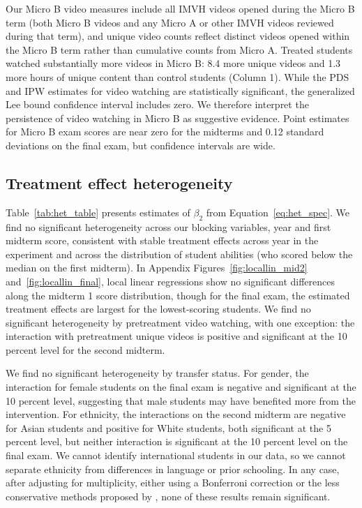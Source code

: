 
Our Micro B video measures include all IMVH videos opened during the Micro B term (both Micro B videos and any Micro A or other IMVH videos reviewed during that term), and unique video counts reflect distinct videos opened within the Micro B term rather than cumulative counts from Micro A.
Treated students watched substantially more videos in Micro B: 8.4 more unique videos and 1.3 more hours of unique content than control students (Column 1).
While the PDS and IPW estimates for video watching are statistically significant, the generalized Lee bound confidence interval includes zero.
We therefore interpret the persistence of video watching in Micro B as suggestive evidence.
Point estimates for Micro B exam scores are near zero for the midterms and 0.12 standard deviations on the final exam, but confidence intervals are wide.


\subsection{Treatment effect heterogeneity}\label{subsec:heterogeneity}

Table~\ref{tab:het_table} presents estimates of $\beta_2$ from Equation~\ref{eq:het_spec}.
We find no significant heterogeneity across our blocking variables, year and first midterm score, consistent with stable treatment effects across year in the experiment and across the distribution of student abilities (who scored below the median on the first midterm).
In Appendix Figures~\ref{fig:locallin_mid2} and~\ref{fig:locallin_final}, local linear regressions show no significant differences along the midterm 1 score distribution, though for the final exam, the estimated treatment effects are largest for the lowest-scoring students.
We find no significant heterogeneity by pretreatment video watching, with one exception: the interaction with pretreatment unique videos is positive and significant at the 10 percent level for the second midterm.


We find no significant heterogeneity by transfer status.
For gender, the interaction for female students on the final exam is negative and significant at the 10 percent level, suggesting that male students may have benefited more from the intervention.
For ethnicity, the interactions on the second midterm are negative for Asian students and positive for White students, both significant at the 5 percent level, but neither interaction is significant at the 10 percent level on the final exam.
We cannot identify international students in our data, so we cannot separate ethnicity from differences in language or prior schooling.
In any case, after adjusting for multiplicity, either using a Bonferroni correction or the less conservative methods proposed by \textcite{lsx2019}, none of these results remain significant.

